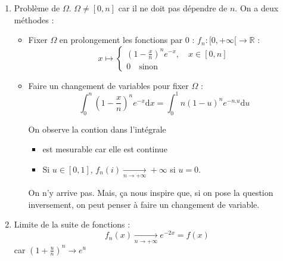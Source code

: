 \begin{solution}
    \begin{enumerate}

      \item Problème de $\Omega$. $\Omega \ne [0, n]$ car il ne doit pas dépendre de $n$. 
        On a deux méthodes : 
        \begin{itemize}

            \item Fixer $\Omega$ en prolongement les fonctions par 0 :  $f_n : [0, + \infty[ \to \mathbb{R}$ : 
              \begin{equation}
                x \mapsto \begin{cases}
                  \left( 1- \frac{x}{n}  \right) ^{n} e ^{-x}, \quad x \in [0, n] \\ 
                  0 \quad \text{sinon}
                \end{cases}
              \end{equation}

            \item Faire un changement de variables pour fixer $\Omega$ : 
              \begin{equation}
                \int_{0}^{n} \left( 1- \frac{x}{n}  \right) ^{n} e ^{-x} \mathrm{d}x = \int_{0}^{1} n(1-u) ^{n} e 
                ^{-n.u} \mathrm{d}u
              \end{equation}

              On observe la contion dans l'intégrale 
              \begin{itemize}

                  \item est mesurable car elle est continue 
                  \item Si $u \in [0,1]$, $f_n(i)  \underset{n \to +\infty}{\longrightarrow} + \infty$ si $u=0$. 

              \end{itemize}

              On n'y arrive pas. Mais, ça nous inspire que, si on pose la question inversement, on peut penser à faire un changement de variable.




        \end{itemize}

      \item Limite de la suite de fonctions : 
        \begin{equation}
          f_n(x)  \underset{n \to +\infty}{\longrightarrow} e ^{-2x} = f(x)
        \end{equation}
        car $ \left( 1 + \frac{u}{n}   \right) ^{n} \to e ^{u}$


\end{enumerate}
\end{solution}
